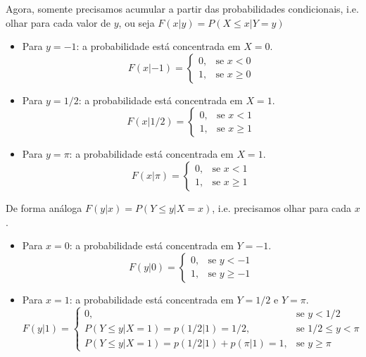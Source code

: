 {\begin{itemize}
\end{itemize}
Agora, somente precisamos acumular a partir das probabilidades condicionais, i.e. olhar para cada valor de $y$, ou seja $F(x|y) = P(X \le x | Y=y)$
\begin{itemize}
	\item Para $y=-1$: a probabilidade está concentrada em $X=0$.
	$$ F(x|-1) = 
	\begin{cases}
		0, & \text{se } x < 0 \\
		1, & \text{se } x \ge 0
	\end{cases}
	$$
	\item Para $y=1/2$: a probabilidade está concentrada em $X=1$.
	$$ F(x|1/2) = 
	\begin{cases}
		0, & \text{se } x < 1 \\
		1, & \text{se } x \ge 1
	\end{cases}
	$$
	\item Para $y=\pi$: a probabilidade está concentrada em $X=1$.
	$$ F(x|\pi) = 
	\begin{cases}
		0, & \text{se } x < 1 \\
		1, & \text{se } x \ge 1
	\end{cases}
	$$
\end{itemize}

De forma análoga $F(y|x) = P(Y \le y | X=x)$, i.e. precisamos olhar para cada $x$.
\begin{itemize}
	\item Para $x=0$: a probabilidade está concentrada em $Y=-1$.
	$$ F(y|0) = 
	\begin{cases}
		0, & \text{se } y < -1 \\
		1, & \text{se } y \ge -1
	\end{cases}
	$$
	\item Para $x=1$: a probabilidade está concentrada em $Y=1/2$ e $Y=\pi$.
	$$ F(y|1) = 
	\begin{cases}
		0, & \text{se } y < 1/2 \\
		P(Y \le y | X=1) = p(1/2|1) = 1/2, & \text{se } 1/2 \le y < \pi \\
		P(Y \le y | X=1) = p(1/2|1) + p(\pi|1) = 1, & \text{se } y \ge \pi
	\end{cases}
	$$
\end{itemize}

}



